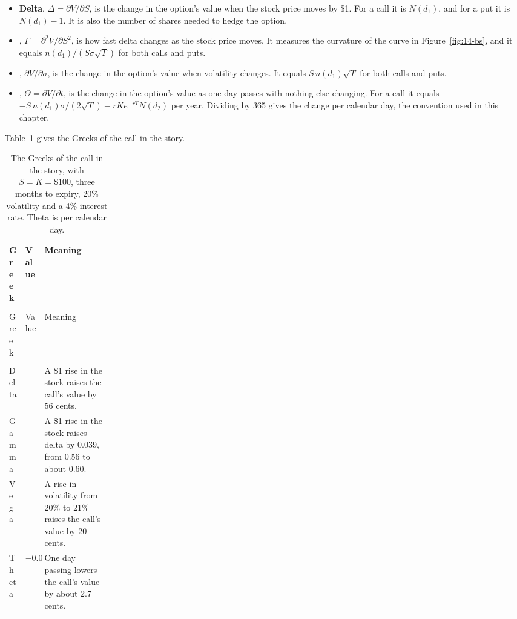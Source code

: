 \begin{itemize}
  \item \textbf{Delta}, $\Delta = \partial V/\partial S$, is the change in the option's value when the stock price moves by \$1. For a call it is $N(d_1)$, and for a put it is $N(d_1) - 1$. It is also the number of shares needed to hedge the option.
  \item {}, $\Gamma = \partial^2 V/\partial S^2$, is how fast delta changes as the stock price moves. It measures the curvature of the curve in Figure~\ref{fig:14-bs}, and it equals $n(d_1)/(S\sigma\sqrt{T})$ for both calls and puts.
  \item {}, $\partial V/\partial \sigma$, is the change in the option's value when volatility changes. It equals $S\,n(d_1)\sqrt{T}$ for both calls and puts.
  \item {}, $\Theta = \partial V/\partial t$, is the change in the option's value as one day passes with nothing else changing. For a call it equals $-S\,n(d_1)\sigma/(2\sqrt{T}) - rKe^{-rT}N(d_2)$ per year. Dividing by 365 gives the change per calendar day, the convention used in this chapter.
\end{itemize}

Table~\ref{tab:14-greeks} gives the Greeks of the call in the story.

\begingroup
\setlength{\LTpre}{6pt}\setlength{\LTpost}{6pt}
\begin{longtable}{@{}>{\raggedright\arraybackslash}p{0.10\linewidth}>{\centering\arraybackslash}p{0.10\linewidth}>{\raggedright\arraybackslash}p{}@{}}
\caption{The Greeks of the call in the story, with $S = K = \$100$, three months to expiry, 20\% volatility and a 4\% interest rate. Theta is per calendar day.}
\label{tab:14-greeks} \\
\toprule
Greek & Value & Meaning \\
\midrule
\endfirsthead
\multicolumn{3}{@{}l}{\emph{(continued)}} \\
\toprule
Greek & Value & Meaning \\
\midrule
\endhead
\midrule
\multicolumn{3}{r@{}}{\emph{(continued on the next page)}} \\
\endfoot
\bottomrule
\endlastfoot
Delta & 0.56   & A \$1 rise in the stock raises the call's value by 56 cents. \\*
Gamma & 0.039  & A \$1 rise in the stock raises delta by 0.039, from 0.56 to about 0.60. \\
Vega  & 0.20   & A rise in volatility from 20\% to 21\% raises the call's value by 20 cents. \\*
Theta & $-0.027$ & One day passing lowers the call's value by about 2.7 cents. \\
\end{longtable}
\endgroup

